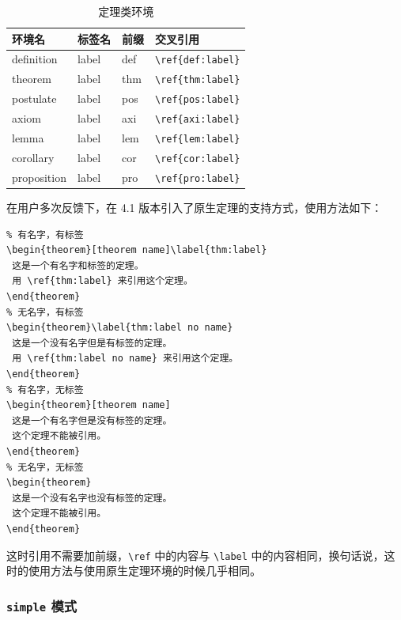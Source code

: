 \documentclass[lang=cn,newtx,10pt,scheme=chinese,pad,twocol]{zznote}
\begin{document}
\begin{table}[htbp]
	\centering
	\caption{定理类环境}
	\begin{tabular}{llll}
		\toprule
		环境名         & 标签名   & 前缀  & 交叉引用                        \\
		\midrule
		definition  & label & def & \lstinline|\ref{def:label}| \\
		theorem     & label & thm & \lstinline|\ref{thm:label}| \\
		postulate   & label & pos & \lstinline|\ref{pos:label}| \\
		axiom       & label & axi & \lstinline|\ref{axi:label}| \\
		lemma       & label & lem & \lstinline|\ref{lem:label}| \\
		corollary   & label & cor & \lstinline|\ref{cor:label}| \\
		proposition & label & pro & \lstinline|\ref{pro:label}| \\
		\bottomrule
	\end{tabular}%
	\label{tab:theorem-class}%
\end{table}%

在用户多次反馈下，在 4.1 版本引入了原生定理的支持方式，使用方法如下：

\begin{lstlisting}
% 有名字，有标签
\begin{theorem}[theorem name]\label{thm:label}
 这是一个有名字和标签的定理。
 用 \ref{thm:label} 来引用这个定理。
\end{theorem}
% 无名字，有标签
\begin{theorem}\label{thm:label no name}
 这是一个没有名字但是有标签的定理。
 用 \ref{thm:label no name} 来引用这个定理。
\end{theorem}
% 有名字，无标签
\begin{theorem}[theorem name]
 这是一个有名字但是没有标签的定理。
 这个定理不能被引用。
\end{theorem}
% 无名字，无标签
\begin{theorem}
 这是一个没有名字也没有标签的定理。
 这个定理不能被引用。
\end{theorem}
\end{lstlisting}
这时引用不需要加前缀，\lstinline{\ref} 中的内容与 \lstinline{\label} 中的内容相同，换句话说，这时的使用方法与使用原生定理环境的时候几乎相同。

\subsubsection{\texttt{simple} 模式}
\end{document}
